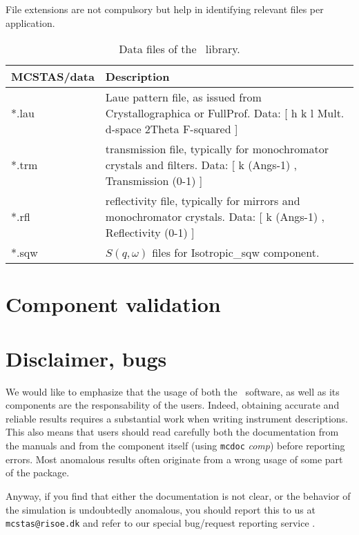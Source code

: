 File extensions are not compulsory but help in identifying relevant files per application.

\begin{table}
  \begin{center}
    {\let\my=\\
    \begin{tabular}{|p{}|p{}|}
      \hline
       {\bf MCSTAS/data} & Description \\
       \hline
 *.lau & Laue pattern file, as issued from Crystallographica or FullProf.
       Data: [ h   k   l Mult. d-space 2Theta   F-squared ] \\
 *.trm & transmission file, typically for monochromator crystals and filters.
       Data: [ k (Angs-1) , Transmission (0-1) ] \\
 *.rfl & reflectivity file, typically for mirrors and monochromator crystals.
       Data: [ k (Angs-1) , Reflectivity (0-1) ] \\
 *.sqw & $S(q,\omega)$ files for Isotropic\_sqw component. \\
      \hline
    \end{tabular}
    \caption{Data files of the \MCS\ library.}
    \label{t:comp-data}
    }
  \end{center}
\end{table}

\section{Component validation}

\section{Disclaimer, bugs}

We would like to emphasize that the usage of both the \MCS\ software, as well as its components are the responsability of the users. Indeed, obtaining accurate and reliable results requires a substantial work when writing instrument descriptions. This also means that users should read carefully both the documentation from the manuals \cite{mcstasmanual} and from the component itself (using \verb+mcdoc+ {\it comp}) before reporting errors. Most anomalous results often originate from a wrong usage of some part of the package.

Anyway, if you find that either the documentation is not clear, or the behavior of the simulation is undoubtedly anomalous, you should report this to us at \verb+mcstas@risoe.dk+ and refer to our special bug/request reporting service \cite{mczilla_webpage}.
